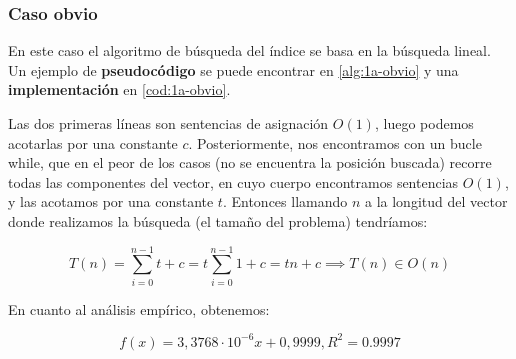 \subsubsection{Caso obvio} \label{sec:1a-obvio}

En este caso el algoritmo de búsqueda del índice se basa en la búsqueda lineal. Un ejemplo de \textbf{pseudocódigo} 
se puede encontrar en \ref{alg:1a-obvio} y una \textbf{implementación} en \ref{cod:1a-obvio}.





 


Las dos primeras líneas son sentencias de asignación $O(1)$, luego podemos acotarlas por una constante $c$. 
Posteriormente, nos encontramos con un bucle while, que en el peor de los casos (no se encuentra la posición buscada) 
recorre todas las componentes del vector, en cuyo cuerpo encontramos sentencias $O(1)$, y las acotamos por una constante $t$.
Entonces llamando $n$ a la longitud del vector donde realizamos la búsqueda (el tamaño del problema) tendríamos: 

\begin{equation}
    T(n) = \sum_{i=0}^{n-1} t + c = t \sum_{i=0}^{n-1} 1 + c = tn + c \implies \boxed{T(n) \in O(n)}
\end{equation}

En cuanto al análisis empírico, obtenemos:

\begin{equation}
\boxed{f(x) = 3,3768 \cdot 10^{-6} x + 0,9999, R^2 = 0.9997}
\label{eq:1a-obv-regresion}
\end{equation}

